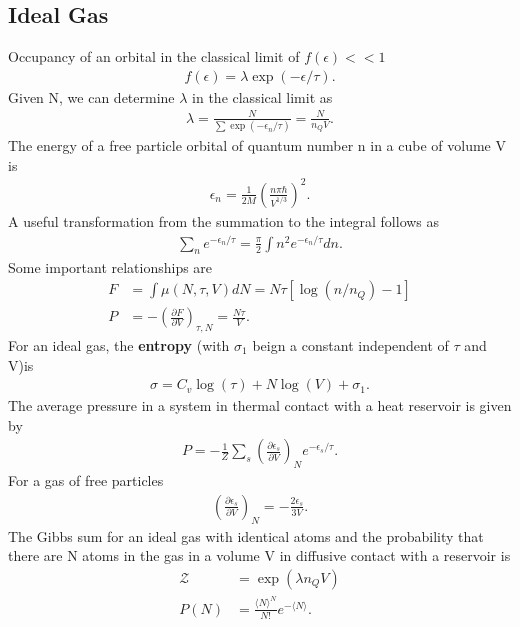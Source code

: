 \begin{multicols}{2}
	\section{Ideal Gas}
	Occupancy of an orbital in the classical limit of $f(\epsilon) << 1$
	\begin{align}
	f(\epsilon) = \lambda \exp(-\epsilon/\tau).
	\end{align}
	Given N, we can determine $\lambda$ in the classical limit as
	\begin{align}
	\lambda = \frac{N}{\sum \exp(-\epsilon_n/\tau)} = \frac{N}{n_Q V}.
	\end{align}
	The energy of a free particle orbital of quantum number n in a cube of volume V is
	\begin{align}
	\epsilon_n = \frac{1}{2M}\left(\frac{n \pi \hbar}{V^{1/3}}\right)^2.
	\end{align}
	A useful transformation from the summation to the integral follows as
	\begin{align}
	\sum_n e^{-\epsilon_n/\tau} = \frac{\pi}{2}\int n^2 e^{-\epsilon_n/\tau} dn.
	\end{align}
	Some important relationships are
	\begin{align}
	F &= \int \mu(N, \tau, V) dN = N\tau[\log(n/n_Q)-1] \\
	P&= -\left(\frac{\partial F}{\partial V}\right)_{\tau,N} = \frac{N\tau}{V}.
	\end{align}
	For an ideal gas, the \textbf{entropy} (with $\sigma_1$ beign a constant independent of $\tau$ and V)is
	\begin{align}
	\sigma = C_v \log(\tau)+N\log(V)+\sigma_1.
	\end{align}
	The average pressure in a system in thermal contact with a heat reservoir is given by 
	\begin{align}
	P= -\frac{1}{Z}\sum_s \left(\frac{\partial \epsilon_s}{\partial  V}\right)_N e^{-\epsilon_s/\tau}.
	\end{align}
	For a gas of free particles
	\begin{align}
	\left(\frac{\partial \epsilon_s}{\partial  V}\right)_N = -\frac{2\epsilon_s}{3V}.
	\end{align}
	The Gibbs sum for an ideal gas with identical atoms and the probability that there are N atoms in the gas in a volume V in diffusive contact with a reservoir is
	\begin{align}
	\mathcal{Z} &= \exp(\lambda n_Q V) \\
	P(N) &= \frac{\langle N \rangle^N}{N!} e^{-\langle N \rangle}.
	\end{align}
\end{multicols}